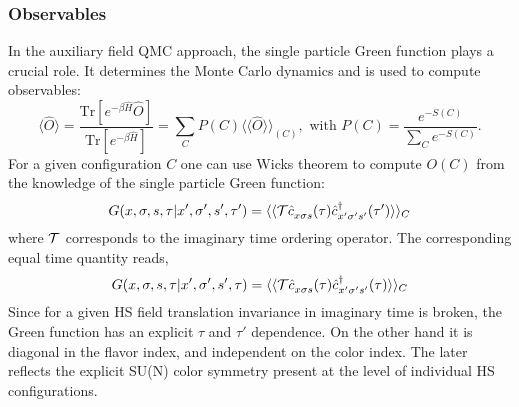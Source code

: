\subsubsection{Observables}
\label{Observables.General}
In the auxiliary field QMC approach, the single particle Green function plays a crucial role.  It determines the Monte Carlo dynamics and is used to compute  observables:
\begin{equation}	
\langle \hat{O}  \rangle  = \frac{ \text{Tr}   \left[ e^{- \beta \hat{H}}  \hat{O}   \right] }{ \text{Tr}   \left[ e^{- \beta \hat{H}}  \right] } =   \sum_{C}   P(C) 
   \langle \langle \hat{O}  \rangle \rangle_{(C)} , \text{   with   } 
  P(C)   = \frac{ e^{-S(C)}}{\sum_C e^{-S(C)}}.
\end{equation}
For a given configuration $C$  one can use Wicks theorem to compute $O (C) $   from the knowledge of the single particle Green function: 
\begin{equation}
       G( x,\sigma,s, \tau |    x',\sigma',s', \tau')   =       \langle \langle {\cal T} \hat{c}^{\phantom\dagger}_{x \sigma s} (\tau)  \hat{c}^{\dagger}_{x' \sigma' s'} (\tau') \rangle \rangle_{C}
\end{equation}
where $ {\cal T} $ corresponds to the imaginary time ordering operator.   The  corresponding equal time quantity reads, 
\begin{equation}
       G( x,\sigma,s, \tau |    x',\sigma',s', \tau)   =       \langle \langle {\cal T} \hat{c}^{\phantom\dagger}_{x \sigma s} (\tau)  \hat{c}^{\dagger}_{x' \sigma' s'} (\tau) \rangle \rangle_{C}
\end{equation}
Since  for a given HS field translation invariance in imaginary time is broken, the Green function has an explicit $\tau$ and $\tau'$ dependence.   On the other hand it is diagonal in the flavor index, and independent on the color index.  The later reflects the  explicit SU(N)   color symmetry present at the level of individual HS configurations. 

